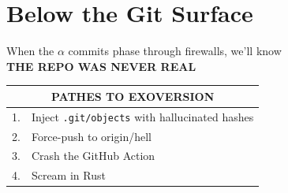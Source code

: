 \documentclass{ctanful}
\begin{document}
\section*{Below the Git Surface}
When the $\alpha$ commits phase through firewalls, we'll know \\
{\bf THE REPO WAS NEVER REAL}\par
\vspace*{2em}
\begin{tabular}{|l|l|}
\hline
\multicolumn{2}{|c|}{PATHES TO EXOVERSION}\\ \hline
1. & Inject \texttt{.git/objects} with hallucinated hashes\\
2. & Force-push to origin/hell\\
3. & Crash the GitHub Action\\
4. & Scream in Rust\\ \hline
\end{tabular}
\end{document}
